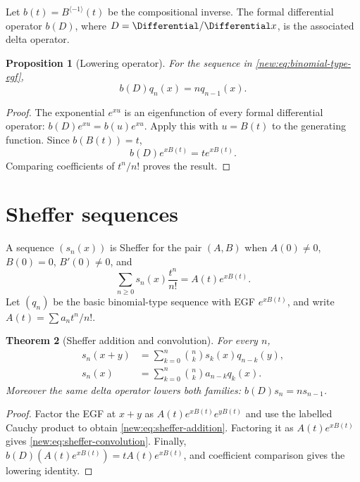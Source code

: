 \documentclass[11pt,a4paper,oneside,openany]{book}
\newtheorem{theorem}{Theorem}[chapter]
\newtheorem{proposition}[theorem]{Proposition}
\theoremstyle{definition}
\theoremstyle{remark}
\begin{document}
Let $b(t)=B^{\langle-1\rangle}(t)$ be the compositional inverse.  The formal
differential operator $b(D)$, where $D=\Differential/\Differential x$, is the associated delta
operator.

\begin{proposition}[Lowering operator]
For the sequence in \eqref{new:eq:binomial-type-egf},
\begin{equation}
 b(D)q_n(x)=nq_{n-1}(x).
 \label{new:eq:delta-lowering}
\end{equation}
\end{proposition}

\begin{proof}
The exponential $e^{xu}$ is an eigenfunction of every formal differential
operator: $b(D)e^{xu}=b(u)e^{xu}$.  Apply this with $u=B(t)$ to the generating
function.  Since $b(B(t))=t$,
\[
 b(D)e^{xB(t)}=t e^{xB(t)}.
\]
Comparing coefficients of $t^n/n!$ proves the result.
\end{proof}

\section{Sheffer sequences}

A sequence $(s_n(x))$ is Sheffer for the pair $(A,B)$ when
$A(0)\ne0$, $B(0)=0$, $B'(0)\ne0$, and
\begin{equation}
 \sum_{n\ge0}s_n(x)\frac{t^n}{n!}
 =A(t)e^{xB(t)}.
 \label{new:eq:sheffer-egf}
\end{equation}
Let $(q_n)$ be the basic binomial-type sequence with EGF $e^{xB(t)}$, and write
$A(t)=\sum a_nt^n/n!$.

\begin{theorem}[Sheffer addition and convolution]
For every $n$,
\begin{align}
 s_n(x+y)&=\sum_{k=0}^n\binom nk s_k(x)q_{n-k}(y),
 \label{new:eq:sheffer-addition}\\
 s_n(x)&=\sum_{k=0}^n\binom nk a_{n-k}q_k(x).
 \label{new:eq:sheffer-convolution}
\end{align}
Moreover the same delta operator lowers both families:
$b(D)s_n=ns_{n-1}$.
\end{theorem}

\begin{proof}
Factor the EGF at $x+y$ as
$A(t)e^{xB(t)}e^{yB(t)}$ and use the labelled Cauchy product to obtain
\eqref{new:eq:sheffer-addition}.  Factoring it as $A(t)e^{xB(t)}$ gives
\eqref{new:eq:sheffer-convolution}.  Finally,
$b(D)(A(t)e^{xB(t)})=tA(t)e^{xB(t)}$, and coefficient comparison gives the
lowering identity.
\end{proof}
\end{document}
